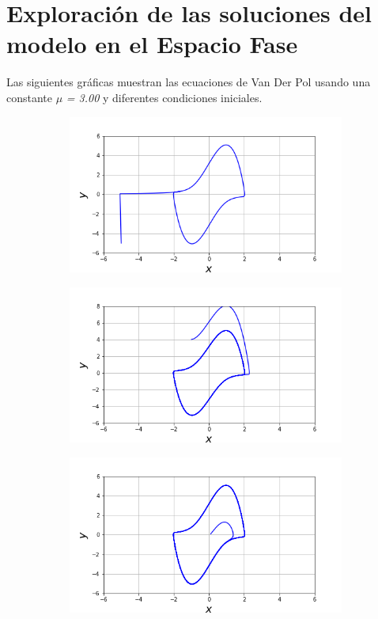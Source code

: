 \documentclass{article}
\begin{document}
\section{Exploración de las soluciones del modelo en el Espacio Fase}

Las siguientes gráficas muestran las ecuaciones de Van Der Pol usando una constante $\mu$ \textit{= 3.00} y diferentes condiciones iniciales.

\begin{figure}[h!]
  \centering
  \begin{subfigure}[b]{0.45\linewidth}
    \includegraphics[width=\linewidth]{EspacioFase1.png}
     \caption{}
  \end{subfigure}
  \begin{subfigure}[b]{0.45\linewidth}
    \includegraphics[width=\linewidth]{EspacioFase3.png}
    \caption{}
  \end{subfigure}
  \begin{subfigure}[b]{0.45\linewidth}
    \includegraphics[width=\linewidth]{EspacioFase4.png}

\end{subfigure}
\end{figure}
\end{document}
